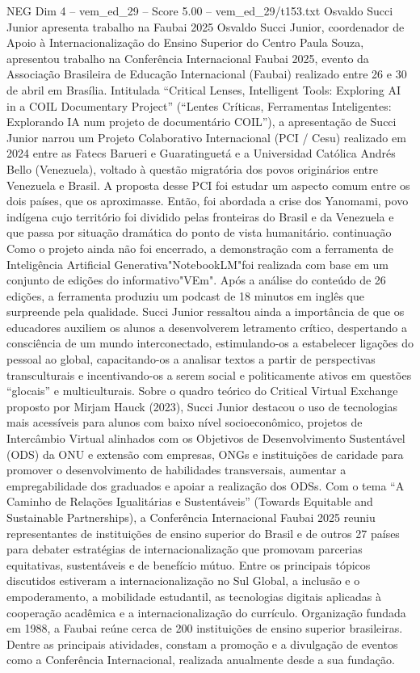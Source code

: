 \begin{textsample}{NEG Dim 4 – vem\_ed\_29 – Score 5.00 – vem\_ed\_29/t153.txt}  \label{ex:f4_neg_161}
Osvaldo Succi Junior apresenta trabalho na Faubai 2025 Osvaldo Succi Junior, coordenador de Apoio à Internacionalização do Ensino Superior do Centro Paula Souza, apresentou trabalho na Conferência Internacional Faubai 2025, evento da Associação Brasileira de Educação Internacional (Faubai) realizado entre 26 e 30 de abril em Brasília.
Intitulada “Critical Lenses, Intelligent Tools: Exploring AI in a COIL Documentary Project” (“Lentes Críticas, Ferramentas Inteligentes: Explorando IA num projeto de documentário COIL”), a apresentação de Succi Junior narrou um Projeto Colaborativo Internacional (PCI / Cesu) realizado em 2024 entre as Fatecs Barueri e Guaratinguetá e a Universidad Católica Andrés Bello (Venezuela), voltado à questão migratória dos povos originários entre Venezuela e Brasil.
A proposta desse PCI foi estudar um aspecto comum entre os dois países, que os aproximasse.
Então, foi abordada a crise dos Yanomami, povo indígena cujo território foi dividido pelas fronteiras do Brasil e da Venezuela e que passa por situação dramática do ponto de vista humanitário. continuação Como o projeto ainda não foi encerrado, a demonstração com a ferramenta de Inteligência Artificial Generativa"NotebookLM"foi realizada com base em um conjunto de edições do informativo"VEm".
Após a análise do conteúdo de 26 edições, a ferramenta produziu um podcast de 18 minutos em inglês que surpreende pela qualidade.
Succi Junior ressaltou ainda a importância de que os educadores auxiliem os alunos a desenvolverem letramento crítico, despertando a consciência de um mundo interconectado, estimulando-os a estabelecer ligações do pessoal ao global, capacitando-os a analisar textos a partir de perspectivas transculturais e incentivando-os a serem social e politicamente ativos em questões “glocais” e multiculturais.
Sobre o quadro teórico do Critical Virtual Exchange proposto por Mirjam Hauck (2023), Succi Junior destacou o uso de tecnologias mais acessíveis para alunos com baixo nível socioeconômico, projetos de Intercâmbio Virtual alinhados com os Objetivos de Desenvolvimento Sustentável (ODS) da ONU e extensão com empresas, ONGs e instituições de caridade para promover o desenvolvimento de habilidades transversais, aumentar a empregabilidade dos graduados e apoiar a realização dos ODSs.
Com o tema “A Caminho de Relações Igualitárias e Sustentáveis” (Towards Equitable and Sustainable Partnerships), a Conferência Internacional Faubai 2025 reuniu representantes de instituições de ensino superior do Brasil e de outros 27 países para debater estratégias de internacionalização que promovam parcerias equitativas, sustentáveis e de benefício mútuo.
Entre os principais tópicos discutidos estiveram a internacionalização no Sul Global, a inclusão e o empoderamento, a mobilidade estudantil, as tecnologias digitais aplicadas à cooperação acadêmica e a internacionalização do currículo.
Organização fundada em 1988, a Faubai reúne cerca de 200 instituições de ensino superior brasileiras.
Dentre as principais atividades, constam a promoção e a divulgação de eventos como a Conferência Internacional, realizada anualmente desde a sua fundação.

\end{textsample}
